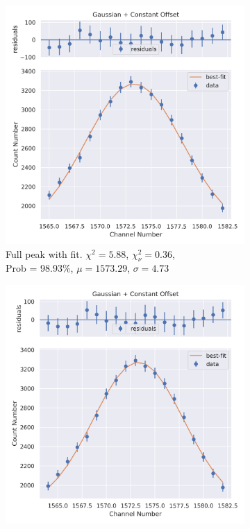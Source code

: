 \documentclass[11pt,a4paper]{article}
\begin{document}
\begin{figure}[H]
  \centering
  \begin{subfigure}{.5\linewidth}
    \centering
    \includegraphics[width=\linewidth]{./Images/Barium133/Gauss/Gauss_3_Full.png}
    \caption{Full peak with fit. $\chi^2 = 5.88$, $\chi^2_\nu = 0.36$, \\ Prob = 98.93\%, $\mu = 1573.29$, $\sigma = 4.73$}
  \end{subfigure}%
  \begin{subfigure}{.5\linewidth}
    \centering
    \includegraphics[width=\linewidth]{./Images/Barium133/Gauss/Gauss_3_Zoom.png}

\end{subfigure}
\end{figure}
\end{document}
